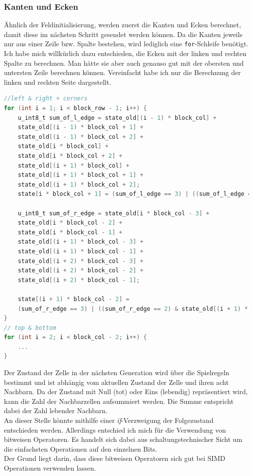 \documentclass[german,plainarticle,hyperref,utf8]{zihpub}
\begin{document}
	\subsubsection{Kanten und Ecken} \label{Kanten}
	Ähnlich der Feldinitialisierung, werden zuerst die Kanten und Ecken berechnet, damit diese im nächsten Schritt gesendet werden können. Da die Kanten jeweils nur aus einer Zeile bzw. Spalte bestehen, wird lediglich eine \texttt{for}-Schleife benötigt.\\
	Ich habe mich willkürlich dazu entschieden, die Ecken mit der linken und rechten Spalte zu berechnen. Man hätte sie aber auch genauso gut mit der obersten und untersten Zeile berechnen können. Vereinfacht habe ich nur die Berechnung der linken und rechten Seite dargestellt.
	\begin{lstlisting}[language=C, caption=Berechnung der Kanten und Ecken]
//left & right + corners
for (int i = 1; i < block_row - 1; i++) {
	u_int8_t sum_of_l_edge = state_old[(i - 1) * block_col] +
	state_old[(i - 1) * block_col + 1] +
	state_old[(i - 1) * block_col + 2] +
	state_old[i * block_col] +
	state_old[i * block_col + 2] +
	state_old[(i + 1) * block_col] +
	state_old[(i + 1) * block_col + 1] +
	state_old[(i + 1) * block_col + 2];
	state[i * block_col + 1] = (sum_of_l_edge == 3) | ((sum_of_l_edge == 2) & state_old[i * block_col + 1]);
	
	u_int8_t sum_of_r_edge = state_old[i * block_col - 3] +
	state_old[i * block_col - 2] +
	state_old[i * block_col - 1] +
	state_old[(i + 1) * block_col - 3] +
	state_old[(i + 1) * block_col - 1] +
	state_old[(i + 2) * block_col - 3] +
	state_old[(i + 2) * block_col - 2] +
	state_old[(i + 2) * block_col - 1];
	
	state[(i + 1) * block_col - 2] =
	(sum_of_r_edge == 3) | ((sum_of_r_edge == 2) & state_old[(i + 1) * block_col - 2]);
}
// top & bottom
for (int i = 2; i < block_col - 2; i++) {
	...
}\end{lstlisting}
	Der Zustand der Zelle in der nächsten Generation wird über die Spielregeln bestimmt und ist abhängig vom aktuellen Zustand der Zelle und ihren acht Nachbarn. Da der Zustand mit Null (tot) oder Eins (lebendig) repräsentiert wird, kann die Zahl der Nachbarzellen aufsummiert werden. Die Summe entspricht dabei der Zahl lebender Nachbarn.\\
	An dieser Stelle könnte mithilfe einer \textit{if}-Verzweigung der Folgezustand entschieden werden. Allerdings entschied ich mich für die Verwendung von bitweisen Operatoren. Es handelt sich dabei aus schaltungstechnischer Sicht um die einfachsten Operationen auf den einzelnen Bits.\\
	Der Grund liegt darin, dass diese bitweisen Operatoren sich gut bei SIMD Operationen verwenden lassen.\\
	
\end{document}
